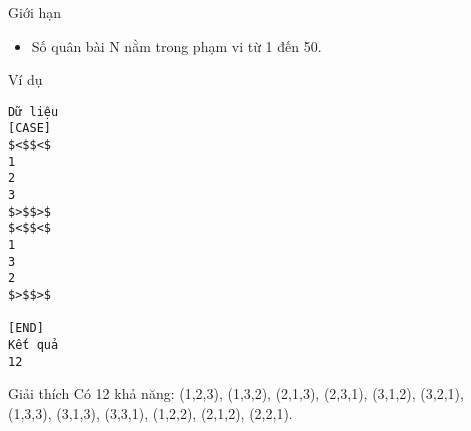 Giới hạn
\begin{itemize}
	\item     Số quân bài N nằm trong phạm vi từ 1 đến 50.   
\end{itemize}
Ví dụ
\begin{verbatim}
Dữ liệu
[CASE]
$<$$<$
1
2 
3
$>$$>$
$<$$<$
1 
3
2
$>$$>$

[END]
Kết quả
12
\end{verbatim}
Giải thích
Có 12 khả năng: (1,2,3), (1,3,2), (2,1,3), (2,3,1), (3,1,2), (3,2,1), (1,3,3), (3,1,3), (3,3,1), (1,2,2), (2,1,2), (2,2,1).